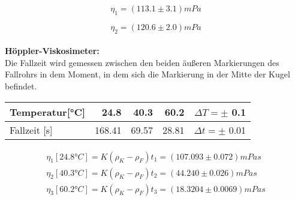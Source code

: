 \documentclass{article}
\begin{document}
$$  \eta_1 =   (113.1 \pm 3.1)mPa $$ 
 
$$  \eta_2 =   (120.6 \pm 2.0)mPa $$ \\

\textbf{Höppler-Viskosimeter:}\\
Die Fallzeit wird gemessen zwischen den beiden äußeren Markierungen des Fallrohrs in dem Moment, in dem sich die Markierung in der Mitte der Kugel befindet.\\
\begin{center}
\begin{tabular}{|l||r|r|r||r|}
\hline
Temperatur[°C] & 24.8 & 40.3 & 60.2 & $\Delta T=\pm$ 0.1\\
\hline
Fallzeit [s] & 168.41 & 69.57 &  28.81 & $\Delta t=\pm$ 0.01\\
\hline
\end{tabular}
\end{center}
\begin{gather*}
\eta_1[24.8°C] = K (\rho_K - \rho_F)t_1%
=(107.093 \pm 0.072) mPa s\\
\eta_2[40.3°C] = K (\rho_K - \rho_F)t_2%
= (44.240 \pm 0.026) mPa s\\
\eta_3[60.2°C] = K (\rho_K - \rho_F)t_3%
= (18.3204 \pm 0.0069) mPa s\\
\end{gather*}
\end{document}

